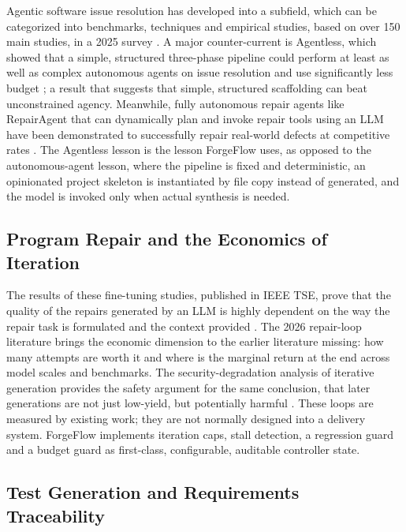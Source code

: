 \documentclass[pdflatex,sn-mathphys-num]{sn-jnl}%
\theoremstyle{thmstyleone}%
\theoremstyle{thmstyletwo}%
\theoremstyle{thmstylethree}%
\begin{document}
Agentic software issue resolution has developed into a subfield, which can be categorized into benchmarks, techniques and empirical studies, based on over 150 main studies, in a 2025 survey \cite{r12jiang}. A major counter-current is Agentless, which showed that a simple, structured three-phase pipeline could perform at least as well as complex autonomous agents on issue resolution and use significantly less budget \cite{r13xia}; a result that suggests that simple, structured scaffolding can beat unconstrained agency. Meanwhile, fully autonomous repair agents like RepairAgent that can dynamically plan and invoke repair tools using an LLM have been demonstrated to successfully repair real-world defects at competitive rates \cite{r14bouzenia}. The Agentless lesson is the lesson ForgeFlow uses, as opposed to the autonomous-agent lesson, where the pipeline is fixed and deterministic, an opinionated project skeleton is instantiated by file copy instead of generated, and the model is invoked only when actual synthesis is needed.

\subsection{Program Repair and the Economics of Iteration}\label{sec2.2}

The results of these fine-tuning studies, published in IEEE TSE, prove that the quality of the repairs generated by an LLM is highly dependent on the way the repair task is formulated and the context provided \cite{r15huang}. The 2026 repair-loop literature brings the economic dimension to the earlier literature missing: how many attempts are worth it \cite{r09kiecker} and where is the marginal return at the end \cite{r10arimbur} across model scales and benchmarks. The security-degradation analysis of iterative generation provides the safety argument for the same conclusion, that later generations are not just low-yield, but potentially harmful \cite{r05shukla}. These loops are measured by existing work; they are not normally designed into a delivery system. ForgeFlow implements iteration caps, stall detection, a regression guard and a budget guard as first-class, configurable, auditable controller state.

\subsection{Test Generation and Requirements Traceability}\label{sec2.3}
\end{document}
